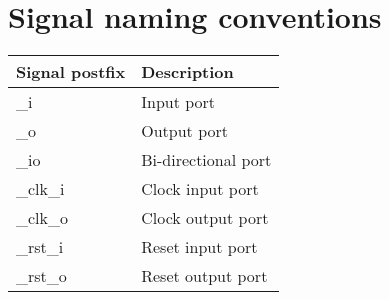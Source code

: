 \documentclass{article}
\begin{document}
\section{Signal naming conventions}

\begin{tabular}{| l | l |}
\hline
\textbf{Signal postfix} & \textbf{Description} \\ \hline
\_i       & Input port          \\ \hline
\_o       & Output port         \\ \hline
\_io      & Bi-directional port \\ \hline
\_clk\_i & Clock input port    \\ \hline
\_clk\_o & Clock output port   \\ \hline
\_rst\_i & Reset input port    \\ \hline
\_rst\_o & Reset output port   \\ \hline
\end{tabular}
\end{document}
